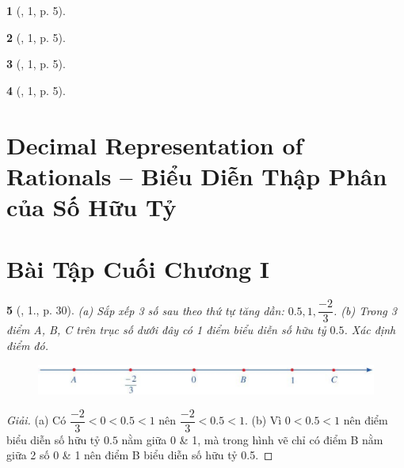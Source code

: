 \documentclass{article}
\newtheorem{baitoan}{}
\begin{document}
\begin{baitoan}[\cite{SGK_Toan_7_Canh_Dieu_tap_1}, 1, p. 5]
	
\end{baitoan}

\begin{baitoan}[\cite{SGK_Toan_7_Canh_Dieu_tap_1}, 1, p. 5]
	
\end{baitoan}

\begin{baitoan}[\cite{SGK_Toan_7_Canh_Dieu_tap_1}, 1, p. 5]
	
\end{baitoan}

\begin{baitoan}[\cite{SGK_Toan_7_Canh_Dieu_tap_1}, 1, p. 5]
	
\end{baitoan}


\section{Decimal Representation of Rationals -- Biểu Diễn Thập Phân của Số Hữu Tỷ}


\section{Bài Tập Cuối Chương I}

\begin{baitoan}[\cite{SGK_Toan_7_Canh_Dieu_tap_1}, 1., p. 30]
	(a) Sắp xếp 3 số sau theo thứ tự tăng dần: $0.5,1,\dfrac{-2}{3}$. (b) Trong 3 điểm A, B, C trên trục số dưới đây có 1 điểm biểu diễn số hữu tỷ $0.5$. Xác định điểm đó.
	\begin{figure}[H]
		\centering
		\includegraphics[scale=.25]{SGK_Toan_7_CD_tap_1_p30}
	\end{figure}
\end{baitoan}

\begin{proof}[Giải]
	(a) Có $\dfrac{-2}{3} < 0 < 0.5 < 1$ nên $\dfrac{-2}{3} < 0.5 < 1$. (b) Vì $0 < 0.5 < 1$ nên điểm biểu diễn số hữu tỷ $0.5$ nằm giữa 0 \& 1, mà trong hình vẽ chỉ có điểm B nằm giữa 2 số 0 \& 1 nên điểm B biểu diễn số hữu tỷ 0.5.
\end{proof}
\end{document}
